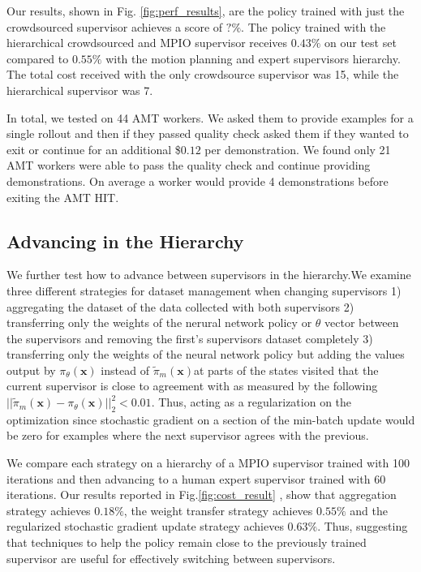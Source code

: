 \documentclass[10pt, conference]{ieeeconf}      %
\newcommand{\bx}{\mathbf{x}}
\begin{document}
Our results, shown in Fig. \ref{fig:perf_results}, are the policy trained with just the crowdsourced supervisor achieves a score of $?\%$. The policy trained with the hierarchical crowdsourced and MPIO supervisor receives $0.43\%$ on our test set compared to $0.55\%$ with the motion planning and expert supervisors hierarchy. The total cost received with the only crowdsource supervisor was 15, while the hierarchical supervisor was 7. 

In total, we tested on 44 AMT workers. We asked them to provide examples for a single rollout and then if they passed quality check asked them if they wanted to exit or continue for an additional \$$0.12$ per demonstration. We found only 21 AMT workers were able to pass the quality check and continue providing demonstrations. On average a worker would provide 4 demonstrations before exiting the AMT HIT. 

\subsection{Advancing in the Hierarchy}
We further test how to advance between supervisors in the hierarchy.We examine three different strategies for dataset management when changing supervisors 1) aggregating the dataset of the data collected with both supervisors 2) transferring only the weights of the nerural network policy or $\theta$ vector between the supervisors and removing the first's supervisors dataset completely 3) transferring only the weights of the neural network policy but adding the values output by $\pi_\theta(\bx)$  instead of $\tilde{\pi}_m(\bx)$at parts of the states visited that the current supervisor is close to agreement with as measured by the following $||\tilde{\pi}_m(\bx) - \pi_\theta(\bx)||^2_2 < 0.01$. Thus, acting as a regularization on the optimization since stochastic gradient on a section of the min-batch update would be zero for examples where the next supervisor agrees with the previous. 


We compare each strategy on a hierarchy of a MPIO supervisor trained with 100 iterations and then advancing to a human expert supervisor trained with 60 iterations.  Our results reported in Fig.\ref{fig:cost_result} , show that aggregation strategy achieves $0.18\%$, the weight transfer strategy achieves $0.55\%$ and the regularized stochastic gradient update strategy achieves $0.63\%$. Thus, suggesting that techniques to help the policy remain close to the previously trained supervisor are useful for effectively switching between supervisors.   
\end{document}
